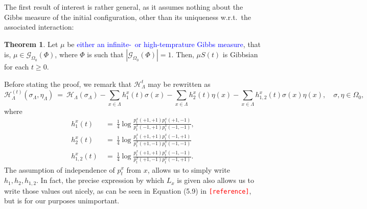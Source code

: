 \documentclass[12pt]{article}
\newcommand{\G}{\mathcal{G}}
\renewcommand{\H}{\mathcal{H}}
\newcommand{\1}{\mathbbm{1}}
\newcommand{\5}{\vspace{0.5cm}}
\theoremstyle{definition}
\newtheorem{thm}{Theorem}[section]
\begin{document}
The first result of interest is rather general, as it assumes nothing about the Gibbs measure of the initial configuration, other than its uniqueness w.r.t.~the associated interaction:

\begin{thm}
Let $\mu$ be \textcolor{blue}{either an infinite-~or high-temprature Gibbs measure}, that is, $\mu\in\G_{\Omega_0}(\Phi)$, where $\Phi$ is such that $|\G_{\Omega_0}(\Phi)|=1$. Then, $\mu S(t)$ is Gibbsian for each $t\geq 0$.
\end{thm}

Before stating the proof, we remark that $\H_\Lambda^t$ may be rewritten as
$$\H_\Lambda^{(t)}(\sigma_\Lambda,\eta_\Lambda) ~=~ \H_\Lambda(\sigma_\Lambda) - \sum_{x\in\Lambda}h_1^x(t)\sigma(x) - \sum_{x\in\Lambda}h_2^x(t)\eta(x) - \sum_{x\in\Lambda}h_{1,2}^x(t)\sigma(x)\eta(x), \quad \sigma,\eta\in\Omega_0,$$
where 
\begin{align*}
h_1^x(t) ~&=~ \frac{1}{4}\log\frac{p_t^x(+1,+1)p_t^x(+1,-1)}{p_t^x(-1,+1)p_t^x(-1,-1)}, \\
h_2^x(t) ~&=~ \frac{1}{4}\log\frac{p_t^x(+1,+1)p_t^x(-1,+1)}{p_t^x(+1,-1)p_t^x(-1,-1)} \\
h_{1,2}^x(t) ~&=~ \frac{1}{4}\log\frac{p_t^{x}(+1,+1)p_t^x(-1,-1)}{p_t^x{(+1,-1)}p_t^{x}(-1,+1)}.
\end{align*}
The assumption of independence of $p_t^x$ from $x$, allows us to simply write $h_1,h_2,h_{1,2}$. In fact, the precise expression by which $L_x$ is given also allows us to write those values out nicely, as can be seen in Equation (5.9) in \textcolor{red}{\texttt{[reference]}}, but is for our purposes unimportant.
\end{document}
